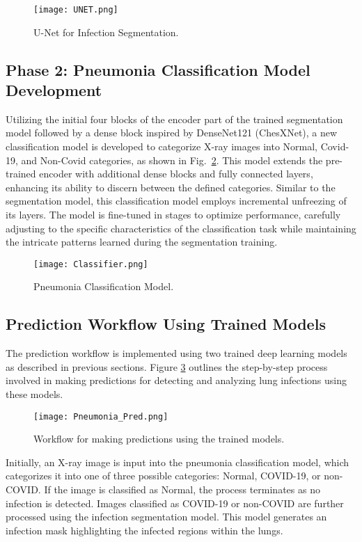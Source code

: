 \documentclass[10pt]{article}
\begin{document}
\begin{figure}[!htbp]
    \centering
    \texttt{[image: UNET.png]}
    \caption{U-Net for Infection Segmentation.}
    \label{fig:UNET}
\end{figure}

\subsection{Phase 2: Pneumonia Classification Model Development}
Utilizing the initial four blocks of the encoder part of the trained segmentation model followed by a dense block inspired by DenseNet121 (ChesXNet), a new classification model is developed to categorize X-ray images into Normal, Covid-19, and Non-Covid categories, as shown in Fig.~\ref{fig:Classifier}. This model extends the pre-trained encoder with additional dense blocks and fully connected layers, enhancing its ability to discern between the defined categories. Similar to the segmentation model, this classification model employs incremental unfreezing of its layers. The model is fine-tuned in stages to optimize performance, carefully adjusting to the specific characteristics of the classification task while maintaining the intricate patterns learned during the segmentation training.

\begin{figure}[!htbp]
    \centering
    \texttt{[image: Classifier.png]}
    \caption{Pneumonia Classification Model.}
    \label{fig:Classifier}
\end{figure}


\subsection{Prediction Workflow Using Trained Models}

The prediction workflow is implemented using two trained deep learning models as described in previous sections. Figure \ref{fig:PredictionWorkflow} outlines the step-by-step process involved in making predictions for detecting and analyzing lung infections using these models.

\begin{figure}[!ht]
    \centering
    \texttt{[image: Pneumonia\_Pred.png]}
    \caption{Workflow for making predictions using the trained models.}
    \label{fig:PredictionWorkflow}
\end{figure}

Initially, an X-ray image is input into the pneumonia classification model, which categorizes it into one of three possible categories: Normal, COVID-19, or non-COVID. If the image is classified as Normal, the process terminates as no infection is detected. Images classified as COVID-19 or non-COVID are further processed using the infection segmentation model. This model generates an infection mask highlighting the infected regions within the lungs.
\end{document}
